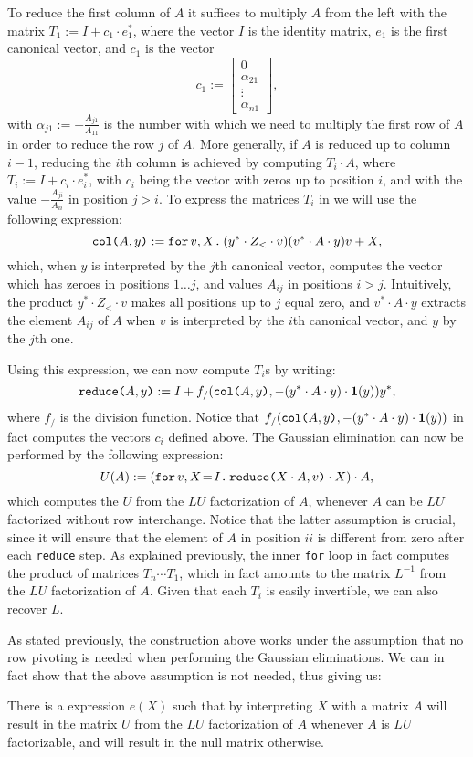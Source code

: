To reduce the first column of $A$ it suffices to multiply $A$ from the left with the matrix $T_1 := I + c_1\cdot e_1^*$, where the vector $I$ is the identity matrix, $e_1$ is the first canonical vector, and $c_1$ is the vector 
\[
c_1 :=
\begin{bmatrix}
    0 \\
    \alpha_{21} \\
    \vdots \\
    \alpha_{n1}
\end{bmatrix},
\]
with $\alpha_{j1} := -\frac{A_{j1}}{A_{11}}$ is the number with which we need to multiply the first row of $A$ in order to reduce the row $j$ of $A$. More generally, if $A$ is reduced up to column $i-1$, reducing the $i$th column is achieved by computing $T_i \cdot A$, where $T_i := I + c_i\cdot e_i^*$, with $c_i$ being the vector with zeros up to position $i$, and with the value $-\frac{A_{ji}}{A_{ii}}$ in position $j > i$. To express the matrices $T_i$ in \langfor we will use the following expression:
$$\ccol{A}{y} := \ffor{v}{X}{(y^*\cdot Z_{<} \cdot v)(v^*\cdot A \cdot y)v + X},$$
which, when $y$ is interpreted by the $j$th canonical vector, computes the vector which has zeroes in positions $1\ldots j$, and values $A_{ij}$ in positions $i>j$. Intuitively, the product $y^*\cdot Z_{<}\cdot v$ makes all positions up to $j$ equal zero, and $v^*\cdot A\cdot y$ extracts the element $A_{ij}$ of $A$ when $v$ is interpreted by the $i$th canonical vector, and $y$ by the $j$th one.



Using this expression, we can now compute $T_i$s by writing:
$$\red{A}{y} := I + f_/(\ccol{A}{y},-(y^*\cdot A\cdot y)\cdot \ones(y))y^*,$$
where $f_/$ is the division function. Notice that $f_/(\ccol{A}{y},-(y^*\cdot A\cdot y)\cdot \ones(y))$ in fact computes the vectors $c_i$ defined above. The Gaussian elimination can now be performed by the following expression:
$$
U(A) :=  \left( \initf{I}{v}{X}{\red{X\cdot A}{v}\cdot X} \right) \cdot A,
$$
which computes the $U$ from the $LU$ factorization of $A$, whenever $A$ can be $LU$ factorized without row interchange. Notice that the latter assumption is crucial, since it will ensure that the element of $A$ in position $ii$ is different from zero after each \texttt{reduce} step. As explained previously, the inner \texttt{for} loop in fact computes the product of matrices $T_{n}\cdots T_1$, which in fact amounts to the matrix $L^{-1}$ from the $LU$ factorization of $A$. Given that each $T_i$ is easily invertible, we can also recover $L$.

As stated previously, the construction above works under the assumption that no row pivoting is needed when performing the Gaussian eliminations. We can in fact show that the above assumption is not needed, thus giving us:
\begin{proposition}\label{prop:gauss}
There is a \langfor expression $e(X)$ such that by interpreting $X$ with a matrix $A$ will result in the matrix $U$ from the $LU$ factorization of $A$ whenever $A$ is $LU$ factorizable, and will result in the null matrix otherwise.
\end{proposition}

